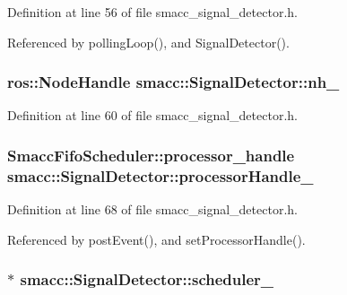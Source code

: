 Definition at line 56 of file smacc\+\_\+signal\+\_\+detector.\+h.



Referenced by polling\+Loop(), and Signal\+Detector().

\subsubsection[{\texorpdfstring{nh\+\_\+}{nh_}}]{\setlength{\rightskip}{0pt plus 5cm}ros\+::\+Node\+Handle smacc\+::\+Signal\+Detector\+::nh\+\_\+\hspace{0.3cm}{\ttfamily [private]}}\hypertarget{classsmacc_1_1SignalDetector_a5c416677fd537afc79f2fbc2e68b2dee}{}\label{classsmacc_1_1SignalDetector_a5c416677fd537afc79f2fbc2e68b2dee}


Definition at line 60 of file smacc\+\_\+signal\+\_\+detector.\+h.

\subsubsection[{\texorpdfstring{processor\+Handle\+\_\+}{processorHandle_}}]{\setlength{\rightskip}{0pt plus 5cm}Smacc\+Fifo\+Scheduler\+::processor\+\_\+handle smacc\+::\+Signal\+Detector\+::processor\+Handle\+\_\+\hspace{0.3cm}{\ttfamily [private]}}\hypertarget{classsmacc_1_1SignalDetector_a9a77dc9f0e9f8f56dff5e76077abcb78}{}\label{classsmacc_1_1SignalDetector_a9a77dc9f0e9f8f56dff5e76077abcb78}


Definition at line 68 of file smacc\+\_\+signal\+\_\+detector.\+h.



Referenced by post\+Event(), and set\+Processor\+Handle().

\subsubsection[{\texorpdfstring{scheduler\+\_\+}{scheduler_}}]{$\ast$ smacc\+::\+Signal\+Detector\+::scheduler\+\_\+\hspace{0.3cm}{\ttfamily [private]}}\hypertarget{classsmacc_1_1SignalDetector_adaee5b9b91d0e6305dc1ab30f7ab566d}{}\label{classsmacc_1_1SignalDetector_adaee5b9b91d0e6305dc1ab30f7ab566d}


